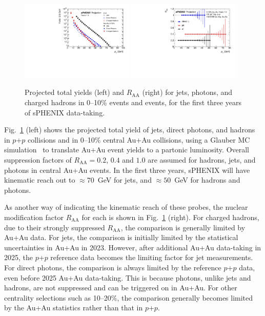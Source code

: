 \begin{figure}[h]
\centering
\includegraphics[width=0.48\textwidth]{figs/master_Years13_yields.pdf}
\includegraphics[width=0.48\textwidth]{figs/RAA_jet_1.pdf}
\caption{Projected total yields (left) and $R_\mathrm{AA}$ (right) for jets, photons, and charged hadrons in 0--10\% \auau events and \pp events, for the first three years of sPHENIX data-taking.}
\label{fig:jet_RAA_proj}
\end{figure}

Fig.~\ref{fig:jet_RAA_proj} (left) shows the projected total yield of jets, direct photons, and hadrons in $p$+$p$ collisions and in 0--10\% central Au+Au collisions, using a Glauber MC simulation~\cite{Miller:2007ri} to translate Au+Au event yields to a partonic luminosity. Overall suppression factors of $R_\mathrm{AA} = 0.2$, $0.4$ and $1.0$ are assumed for hadrons, jets, and photons in central Au+Au events. In the first three years, sPHENIX will have kinematic reach out to $\approx 70$~GeV for jets, and $\approx50$~GeV for hadrons and photons.  

As another way of indicating the kinematic reach of these probes, the nuclear modification factor $R_\mathrm{AA}$ for each is shown in Fig.~\ref{fig:jet_RAA_proj} (right). For charged hadrons, due to their strongly suppressed $R_\mathrm{AA}$, the comparison is generally limited by Au+Au data. For jets, the comparison is initially limited by the statistical uncertainties in Au+Au in 2023. However, after additional Au+Au data-taking in 2025, the $p$+$p$ reference data becomes the limiting factor for jet measurements. For direct photons, the comparison is always limited by the reference $p$+$p$ data, even before 2025 Au+Au data-taking. This is because photons, unlike jets and hadrons, are not suppressed and can be triggered on in Au+Au. For other centrality selections such as 10--20\%, the comparison generally becomes limited by the Au+Au statistics rather than that in $p$+$p$.

